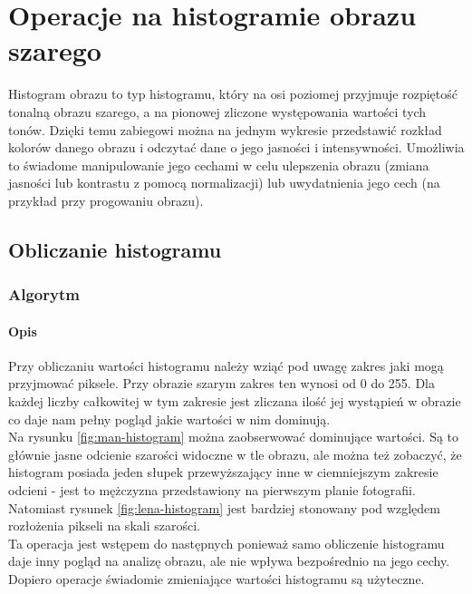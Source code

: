 \documentclass[a4paper,12pt]{book}
\begin{document}
\chapter{Operacje na histogramie obrazu szarego}
Histogram obrazu to typ histogramu, który na osi poziomej przyjmuje rozpiętość tonalną obrazu szarego, a na pionowej zliczone występowania wartości tych tonów. Dzięki temu zabiegowi można na jednym wykresie przedstawić rozkład kolorów danego obrazu i odczytać dane o jego jasności i intensywności.  Umożliwia to świadome manipulowanie jego cechami w celu ulepszenia obrazu (zmiana jasności lub kontrastu z pomocą normalizacji) lub uwydatnienia jego cech (na przykład przy progowaniu obrazu). 

\section{Obliczanie histogramu}
\subsection*{Algorytm}
\subsubsection*{Opis}
Przy obliczaniu wartości histogramu należy wziąć pod uwagę zakres jaki mogą przyjmować piksele. Przy obrazie szarym zakres ten wynosi od 0 do 255. Dla każdej liczby całkowitej w tym zakresie jest zliczana ilość jej wystąpień w obrazie co daje nam pełny pogląd jakie wartości w nim dominują.  \\
Na rysunku \ref{fig:man-histogram} można zaobserwować dominujące wartości. Są to głównie jasne odcienie szarości widoczne w tle obrazu, ale można też zobaczyć, że histogram posiada jeden słupek przewyższający inne w ciemniejszym zakresie odcieni - jest to mężczyzna przedstawiony na pierwszym planie fotografii. \\
Natomiast rysunek \ref{fig:lena-histogram} jest bardziej stonowany pod względem rozłożenia pikseli na skali szarości. \\
Ta operacja jest wstępem do następnych ponieważ samo obliczenie histogramu daje inny pogląd na analizę obrazu, ale nie wpływa bezpośrednio na jego cechy. Dopiero operacje świadomie zmieniające wartości histogramu są użyteczne. 
\end{document}
